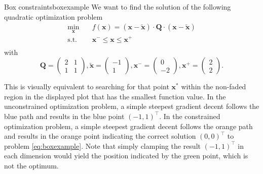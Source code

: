 \begin{example}{Box constraints}{boxexample}
    We want to find the solution of the following quadratic optimization problem
    \begin{equation}
        \begin{aligned}
            \min_{\mathbf{x}} \quad & f(\mathbf{x})= (\mathbf{x}-\tilde{\mathbf{x}}) \cdot \mathbf{Q} \cdot (\mathbf{x}-\tilde{\mathbf{x}})\\
            \textrm{s.t.} \quad     & \mathbf{x}^- \le \mathbf{x} \le \mathbf{x}^+\\
        \end{aligned}
        \label{eq:boxexample}
    \end{equation}
    with 
    \begin{equation}
        \mathbf{Q} = 
        \begin{pmatrix}
        2 & 1 \\
        1 & 1 
        \end{pmatrix}
        ,
        \tilde{\mathbf{x}} = 
        \begin{pmatrix}
        -1\\
        1 
        \end{pmatrix}
        ,
        \mathbf{x}^- = 
        \begin{pmatrix}
        0\\
        -2 
        \end{pmatrix}
        ,
        \mathbf{x}^+ = 
        \begin{pmatrix}
        2\\
        2 
        \end{pmatrix}
        .
    \end{equation}

    \begin{center}
        
    \end{center}

    This is visually equivalent to searching for that point $\mathbf{x}^*$ within the non-faded region in the displayed plot that has the smallest function value. In the unconstrained optimization problem, a simple steepest gradient decent follows the blue path and results in the blue point $(-1, 1)^\top$. In the constrained optimization problem, a simple steepest gradient decent follows the orange path and results in the orange point indicating the correct solution $(0, 0)^\top$ to problem \eqref{eq:boxexample}. Note that simply clamping the result $(-1, 1)^\top$ in each dimension would yield the position indicated by the green point, which is not the optimum.    
\end{example}



